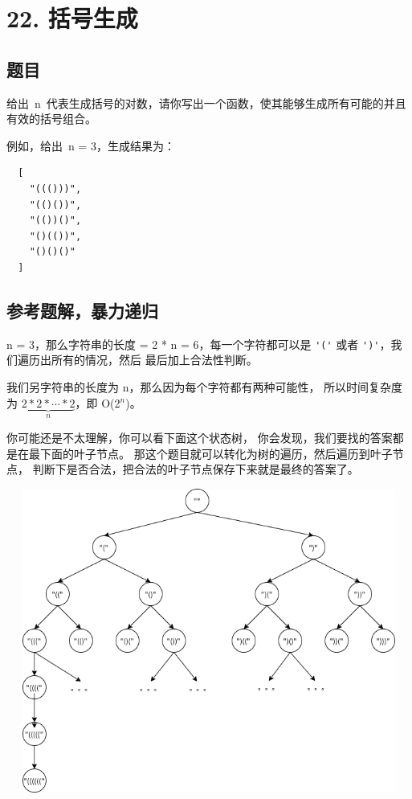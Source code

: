 \newpage
\section{22. 括号生成}
\label{leetcode:22}

\subsection{题目}

给出 n 代表生成括号的对数，请你写出一个函数，使其能够生成所有可能的并且有效的括号组合。

例如，给出 n = 3，生成结果为：

\begin{verbatim}
  [
    "((()))",
    "(()())",
    "(())()",
    "()(())",
    "()()()"
  ]
\end{verbatim}

\subsection{参考题解，暴力递归}

n = 3，那么字符串的长度 = 2 * n = 6，每一个字符都可以是 
\verb|'('| 或者 \verb|')'|，我们遍历出所有的情况，然后
最后加上合法性判断。

我们另字符串的长度为 n，那么因为每个字符都有两种可能性，
所以时间复杂度为 $\underbrace{2*2*\cdots*2}_{n}$，即 O(2$^{n}$)。

你可能还是不太理解，你可以看下面这个状态树，
你会发现，我们要找的答案都是在最下面的叶子节点。
那这个题目就可以转化为树的遍历，然后遍历到叶子节点，
判断下是否合法，把合法的叶子节点保存下来就是最终的答案了。

\includegraphics[width=150mm,height=100mm]{images/leetcode/leetcode_22.png}

